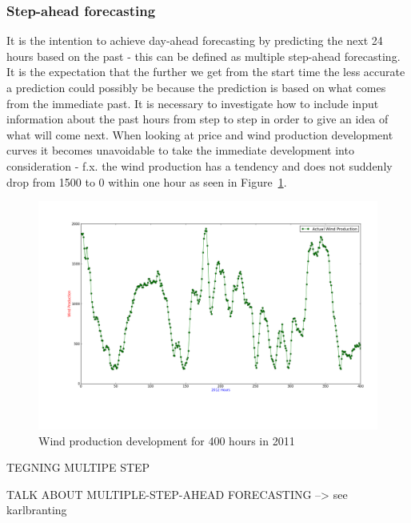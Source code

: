 \subsubsection{Step-ahead forecasting}
It is the intention to achieve day-ahead forecasting by predicting the next 24 hours based on the past - this can be defined as multiple step-ahead forecasting\cite{FIND REF}. It is the expectation that the further we get from the start time the less accurate a prediction could possibly be because the prediction is based on what comes from the immediate past. It is necessary to investigate how to include input information about the past hours from step to step in order to give an idea of what will come next. When looking at price and wind production development curves it becomes unavoidable to take the immediate development into consideration - f.x. the wind production has a tendency and does not suddenly drop from 1500 to 0 within one hour as seen in Figure~\ref{fig:windHourDevelopment400Hours}.

\begin{figure}[H]
\centering
\includegraphics[width=0.99\linewidth,natwidth=898,natheight=587]{billeder/productionTendency400Hours.png}
\caption{Wind production development for 400 hours in 2011}
\label{fig:windHourDevelopment400Hours}
\end{figure}


TEGNING MULTIPE STEP

TALK ABOUT MULTIPLE-STEP-AHEAD FORECASTING --> see karlbranting